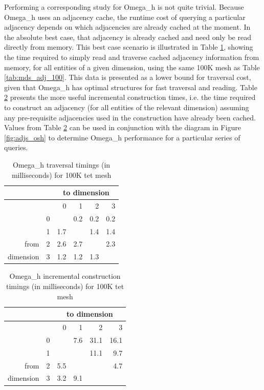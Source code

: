 Performing a corresponding study for Omega\_h is not quite
trivial.
Because Omega\_h uses an adjacency cache, the runtime cost
of querying a particular adjacency depends on which adjacencies
are already cached at the moment.
In the absolute best case, that adjacency is already cached and
need only be read directly from memory.
This best case scenario is illustrated in Table \ref{tab:osh_walk_100},
showing the time required to simply read and traverse cached adjacency
information from memory, for all entities of a given dimension,
using the same 100K mesh as Table \ref{tab:mds_adj_100}.
This data is presented as a lower bound for traversal cost, given
that Omega\_h has optimal structures for fast traversal and reading.
Table \ref{tab:osh_adj_100} presents the more useful incremental construction
times, i.e. the time required to construct an adjacency
(for all entities of the relevant dimension)
assuming any pre-requisite adjacencies used in the construction
have already been cached.
Values from Table \ref{tab:osh_adj_100} can be used in conjunction
with the diagram in Figure \ref{fig:adjs_osh} to determine
Omega\_h performance for a particular series of queries.

\begin{table}
\caption{Omega\_h traversal timings (in milliseconds) for 100K tet mesh}
\label{tab:osh_walk_100}
\begin{center}
\begin{tabular}{|r|r|r r r r}
               &   & \multicolumn{4}{c}{to dimension} \\\hline
               &   &    0 &    1 &    2 &   3  \\\hline
               & 0 &      &  0.2 &  0.2 &  0.2 \\
               & 1 &  1.7 &      &  1.4 &  1.4 \\
from           & 2 &  2.6 &  2.7 &      &  2.3 \\
dimension      & 3 &  1.2 &  1.2 &  1.3 &      \\
\end{tabular}
\end{center}
\end{table}

\begin{table}
\caption{Omega\_h incremental construction timings (in milliseconds) for 100K tet mesh}
\label{tab:osh_adj_100}
\begin{center}
\begin{tabular}{|r|r|r r r r}
               &   & \multicolumn{4}{c}{to dimension} \\\hline
               &   &    0 &    1 &    2 &   3  \\\hline
               & 0 &      &  7.6 & 31.1 & 16.1 \\
               & 1 &      &      & 11.1 &  9.7 \\
from           & 2 &  5.5 &      &      &  4.7 \\
dimension      & 3 &  3.2 &  9.1 &      &      \\
\end{tabular}
\end{center}
\end{table}

